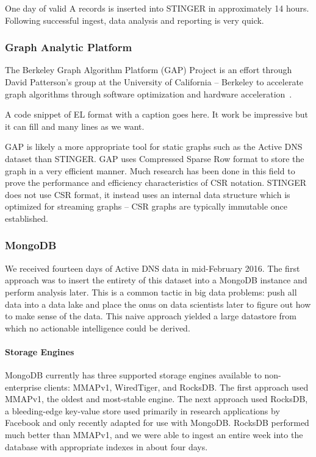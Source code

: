 \documentclass{acm_proc_article-sp}
\begin{document}
One day of valid A records is inserted into STINGER in approximately 14 hours. Following successful ingest, data analysis and reporting is very quick.


\subsubsection{Graph Analytic Platform}
The Berkeley Graph Algorithm Platform (GAP) Project is an effort through David Patterson's group at the University of California -- Berkeley to accelerate graph algorithms through software optimization and hardware acceleration~\cite{GAP}. 

A code snippet of EL format with a caption goes here. It work be impressive but it can fill and many lines as we want.

GAP is likely a more appropriate tool for static graphs such as the Active DNS dataset than STINGER. GAP uses Compressed Sparse Row format to store the graph in a very efficient manner. Much research has been done in this field to prove the performance and efficiency characteristics of CSR notation. STINGER does not use CSR format, it instead uses an internal data structure which is optimized for streaming graphs -- CSR graphs are typically immutable once established.

\subsubsection{MongoDB}
We received fourteen days of Active DNS data in mid-February 2016. The first approach was to insert the entirety of this dataset into a MongoDB instance and perform analysis later. This is a common tactic in big data problems: push all data into a data lake and place the onus on data scientists later to figure out how to make sense of the data. This naive approach yielded a large datastore from which no actionable intelligence could be derived. 

\paragraph{Storage Engines}
MongoDB currently has three supported storage engines available to non-enterprise clients: MMAPv1, WiredTiger, and RocksDB. The first approach used MMAPv1, the oldest and most-stable engine. The next approach used RocksDB, a bleeding-edge key-value store used primarily in research applications by Facebook and only recently adapted for use with MongoDB. RocksDB performed much better than MMAPv1, and we were able to ingest an entire week into the database with appropriate indexes in about four days.
\end{document}
